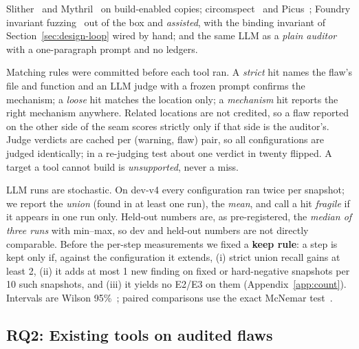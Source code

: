Slither~\cite{slither} and Mythril~\cite{mythril} on build-enabled copies;
circomspect~\cite{circomspect} and Picus~\cite{picus}; Foundry invariant
fuzzing~\cite{foundry} out of the box and \emph{assisted}, with the binding
invariant of Section~\ref{sec:design-loop} wired by hand; and the same LLM as
a \emph{plain auditor} with a one-paragraph prompt and no ledgers.

Matching rules were committed before each tool ran. A \emph{strict} hit names
the flaw's file and function and an LLM judge with a frozen prompt confirms
the mechanism; a \emph{loose} hit matches the location only; a
\emph{mechanism} hit reports the right mechanism anywhere. Related locations
are not credited, so a flaw reported on the other side of the seam scores
strictly only if that side is the auditor's. Judge verdicts are cached per
(warning, flaw) pair, so all configurations are judged identically; in a
re-judging test about one verdict in twenty flipped. A target a tool cannot
build is \emph{unsupported}, never a miss.

LLM runs are stochastic. On dev-v4 every configuration ran twice per snapshot;
we report the \emph{union} (found in at least one run), the \emph{mean}, and
call a hit \emph{fragile} if it appears in one run only. Held-out numbers are,
as pre-registered, the \emph{median of three runs} with min--max, so dev and
held-out numbers are not directly comparable. Before the per-step
measurements we fixed a \textbf{keep rule}: a step is kept only if, against
the configuration it extends, (i) strict union recall gains at least 2, (ii)
it adds at most 1 new finding on fixed or hard-negative snapshots per 10 such
snapshots, and (iii) it yields no E2/E3 on them (Appendix~\ref{app:count}).
Intervals are Wilson 95\%~\cite{wilson1927}; paired comparisons use the exact
McNemar test~\cite{mcnemar1947}.

\subsection{RQ2: Existing tools on audited flaws}\label{sec:eval-rq2}

